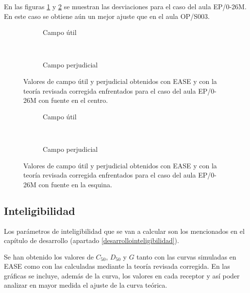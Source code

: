 En las figuras \ref{graf:predictoresepscentro}  y \ref{graf:predictoresepsesquina} se muestran las desviaciones para el caso del aula EP/0-26M. En este caso se obtiene aún un mejor ajuste que en el aula OP/S003.

\begin{figure}[ht]
\centering%
    \begin{subfigure}[b]{0.4\textwidth}
    	\centering%
         {%
    }
    \caption{Campo útil}%
    \end{subfigure}%
    ~
    \begin{subfigure}[b]{0.4\textwidth}%
    	\centering%
        {%
    }
    \caption{Campo perjudicial}%
    \end{subfigure}
    \caption{Valores de campo útil y perjudicial obtenidos con EASE y con la teoría revisada corregida enfrentados para el caso del aula EP/0-26M con fuente en el centro.}
\label{graf:predictoresepscentro}%
\end{figure}
\FloatBarrier 

\begin{figure}[ht]
\centering%
    \begin{subfigure}[b]{0.4\textwidth}
    	\centering%
         {%
    }
    \caption{Campo útil}%
    \end{subfigure}%
    ~
    \begin{subfigure}[b]{0.4\textwidth}%
    	\centering%
        {%
    }
    \caption{Campo perjudicial}%
    \end{subfigure}
    \caption{Valores de campo útil y perjudicial obtenidos con EASE y con la teoría revisada corregida enfrentados para el caso del aula EP/0-26M con fuente en la esquina.}
\label{graf:predictoresepsesquina}%
\end{figure}
\FloatBarrier 

\subsection{Inteligibilidad}

Los parámetros de inteligibilidad que se van a calcular son los mencionados en el capítulo de desarrollo (apartado \ref{desarrollointeligibilidad}).


Se han obtenido los valores de $C_{50}$, $D_{50}$ y $G$ tanto con las curvas simuladas en EASE como con las calculadas mediante la teoría revisada corregida. En las gráficas se incluye, además de la curva, los valores en cada receptor y así poder analizar en mayor medida el ajuste de la curva teórica.
\newpage

